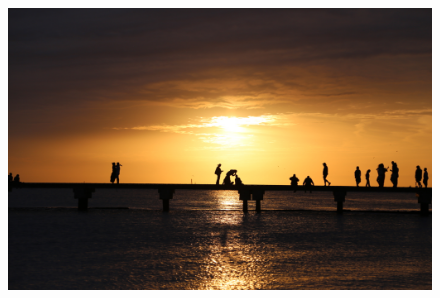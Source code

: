 \documentclass[12pt]{report}
\begin{document}
\vspace{4em}

\begin{figure}[h]
  \begin{center}
  \includegraphics[width=.8\textwidth]{figures/postface.jpg}
  \end{center}
\end{figure}
\end{document}
